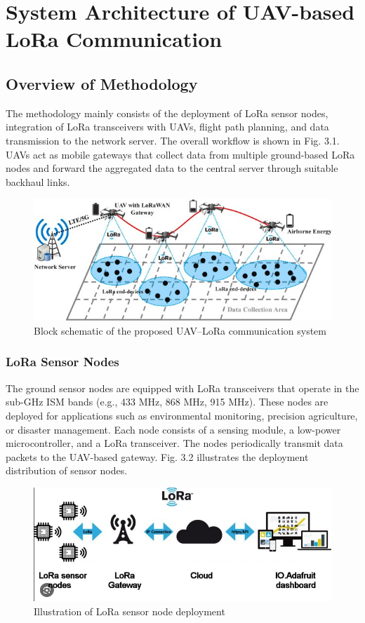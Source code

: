 \chapter{System Architecture of UAV-based LoRa Communication}

\section{Overview of Methodology}
The methodology mainly consists of the deployment of LoRa sensor nodes, integration of LoRa transceivers with UAVs, flight path planning, and data transmission to the network server. The overall workflow is shown in Fig. 3.1. UAVs act as mobile gateways that collect data from multiple ground-based LoRa nodes and forward the aggregated data to the central server through suitable backhaul links.

\begin{figure}[htbp]
\centering
\includegraphics[width=1.1\textwidth,height=.6\textheight]{methodolgy.jpeg}
\caption{Block schematic of the proposed UAV–LoRa communication system} \label{pm}
\end{figure}

\subsection{LoRa Sensor Nodes}
The ground sensor nodes are equipped with LoRa transceivers that operate in the sub-GHz ISM bands (e.g., 433 MHz, 868 MHz, 915 MHz). These nodes are deployed for applications such as environmental monitoring, precision agriculture, or disaster management. Each node consists of a sensing module, a low-power microcontroller, and a LoRa transceiver. The nodes periodically transmit data packets to the UAV-based gateway. Fig. 3.2 illustrates the deployment distribution of sensor nodes.

\begin{figure}[h]
\centering
\includegraphics[width=.7\textwidth]{download.jpeg}
\caption{Illustration of LoRa sensor node deployment} \label{pm}
\end{figure}

